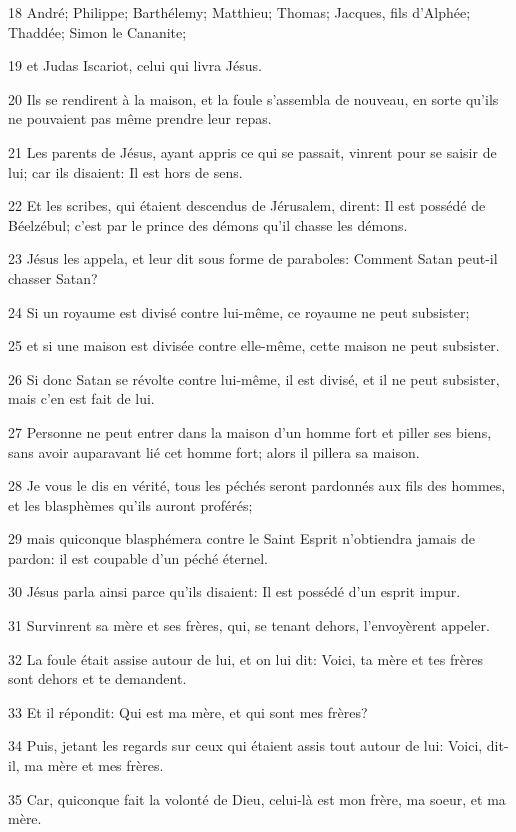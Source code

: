 \par 18 André; Philippe; Barthélemy; Matthieu; Thomas; Jacques, fils d'Alphée; Thaddée; Simon le Cananite;
\par 19 et Judas Iscariot, celui qui livra Jésus.
\par 20 Ils se rendirent à la maison, et la foule s'assembla de nouveau, en sorte qu'ils ne pouvaient pas même prendre leur repas.
\par 21 Les parents de Jésus, ayant appris ce qui se passait, vinrent pour se saisir de lui; car ils disaient: Il est hors de sens.
\par 22 Et les scribes, qui étaient descendus de Jérusalem, dirent: Il est possédé de Béelzébul; c'est par le prince des démons qu'il chasse les démons.
\par 23 Jésus les appela, et leur dit sous forme de paraboles: Comment Satan peut-il chasser Satan?
\par 24 Si un royaume est divisé contre lui-même, ce royaume ne peut subsister;
\par 25 et si une maison est divisée contre elle-même, cette maison ne peut subsister.
\par 26 Si donc Satan se révolte contre lui-même, il est divisé, et il ne peut subsister, mais c'en est fait de lui.
\par 27 Personne ne peut entrer dans la maison d'un homme fort et piller ses biens, sans avoir auparavant lié cet homme fort; alors il pillera sa maison.
\par 28 Je vous le dis en vérité, tous les péchés seront pardonnés aux fils des hommes, et les blasphèmes qu'ils auront proférés;
\par 29 mais quiconque blasphémera contre le Saint Esprit n'obtiendra jamais de pardon: il est coupable d'un péché éternel.
\par 30 Jésus parla ainsi parce qu'ils disaient: Il est possédé d'un esprit impur.
\par 31 Survinrent sa mère et ses frères, qui, se tenant dehors, l'envoyèrent appeler.
\par 32 La foule était assise autour de lui, et on lui dit: Voici, ta mère et tes frères sont dehors et te demandent.
\par 33 Et il répondit: Qui est ma mère, et qui sont mes frères?
\par 34 Puis, jetant les regards sur ceux qui étaient assis tout autour de lui: Voici, dit-il, ma mère et mes frères.
\par 35 Car, quiconque fait la volonté de Dieu, celui-là est mon frère, ma soeur, et ma mère.

